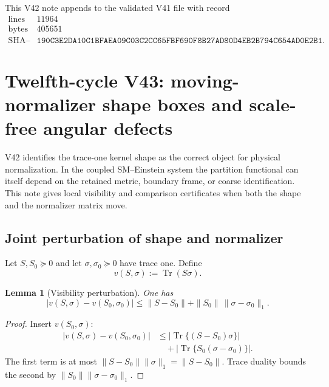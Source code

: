 \documentclass[11pt]{article}
\newtheorem{lemma}[theorem]{Lemma}
\theoremstyle{remark}
\begin{document}
This V42 note appends to the validated V41 file with record
\[
\begin{array}{c|c}
\text{lines}&11964\\
\text{bytes}&405651\\
\text{SHA--256}&
\texttt{190C3E2DA10C1BFAEA09C03C2CC65FBF690F8B27AD80D4EB2B794C654AD0E2B1}.
\end{array}
\]


\section{Twelfth-cycle V43: moving-normalizer shape boxes and
scale-free angular defects}
\label{sec:v12v43}

V42 identifies the trace-one kernel shape as the correct object for
physical normalization.  In the coupled SM--Einstein system the
partition functional can itself depend on the retained metric,
boundary frame, or coarse identification.  This note gives local
visibility and comparison certificates when both the shape and the
normalizer matrix move.

\subsection{Joint perturbation of shape and normalizer}

Let \(S,S_0\succeq0\) and let
\(\sigma,\sigma_0\succeq0\) have trace one.  Define
\[
 v(S,\sigma):=\operatorname{Tr}(S\sigma).
\]

\begin{lemma}[Visibility perturbation]
\label{lem:v12v43-visibility}
One has
\begin{equation}
 |v(S,\sigma)-v(S_0,\sigma_0)|
 \leq
 \|S-S_0\|
 +
 \|S_0\|\,\|\sigma-\sigma_0\|_1.                \tag{43.1}
\end{equation}
\end{lemma}

\begin{proof}
Insert \(v(S_0,\sigma)\):
\begin{align*}
 |v(S,\sigma)-v(S_0,\sigma_0)|
 &\leq
 |\operatorname{Tr}\{(S-S_0)\sigma\}|\\
 &\quad+
 |\operatorname{Tr}\{S_0(\sigma-\sigma_0)\}|.
\end{align*}
The first term is at most
\(\|S-S_0\|\|\sigma\|_1=\|S-S_0\|\).
Trace duality bounds the second by
\(\|S_0\|\|\sigma-\sigma_0\|_1\).
\end{proof}
\end{document}
